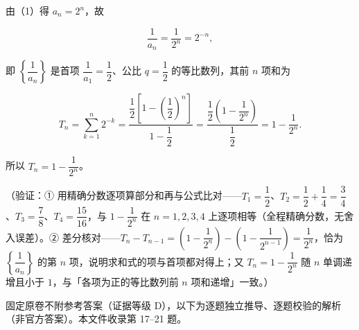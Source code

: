\begin{answer}

由（1）得 \(a_n=2^{n}\)，故

\nopagebreak[4]
\[
\frac{1}{a_n}=\frac{1}{2^{n}}=2^{-n},
\]

即 \(\left\{\dfrac{1}{a_n}\right\}\) 是首项 \(\dfrac{1}{a_1}=\dfrac{1}{2}\)、公比 \(q=\dfrac{1}{2}\) 的等比数列，其前 \(n\) 项和为

\nopagebreak[4]
\[
T_n=\sum_{k=1}^{n}2^{-k}
=\frac{\dfrac{1}{2}\left[1-\left(\dfrac{1}{2}\right)^{n}\right]}{1-\dfrac{1}{2}}
=\frac{\dfrac{1}{2}\left(1-\dfrac{1}{2^{n}}\right)}{\dfrac{1}{2}}
=1-\frac{1}{2^{n}}.
\]

所以 \(T_n=1-\dfrac{1}{2^{n}}\)。

（验证：① 用精确分数逐项算部分和再与公式比对——\(T_1=\dfrac{1}{2}\)、\(T_2=\dfrac{1}{2}+\dfrac{1}{4}=\dfrac{3}{4}\)、\(T_3=\dfrac{7}{8}\)、\(T_4=\dfrac{15}{16}\)，与 \(1-\dfrac{1}{2^{n}}\) 在 \(n=1,2,3,4\) 上逐项相等（全程精确分数，无舍入误差）。② 差分核对——\(T_n-T_{n-1}=\left(1-\dfrac{1}{2^{n}}\right)-\left(1-\dfrac{1}{2^{n-1}}\right)=\dfrac{1}{2^{n}}\)，恰为 \(\left\{\dfrac{1}{a_n}\right\}\) 的第 \(n\) 项，说明求和式的项与首项都对得上；又 \(T_n=1-\dfrac{1}{2^{n}}\) 随 \(n\) 单调递增且小于 \(1\)，与「各项为正的等比数列前 \(n\) 项和递增」一致。）



\begin{gktip}
固定原卷不附参考答案（证据等级 D），以下为逐题独立推导、逐题校验的解析（非官方答案）。本文件收录第 17–21 题。
\end{gktip}

\end{answer}
